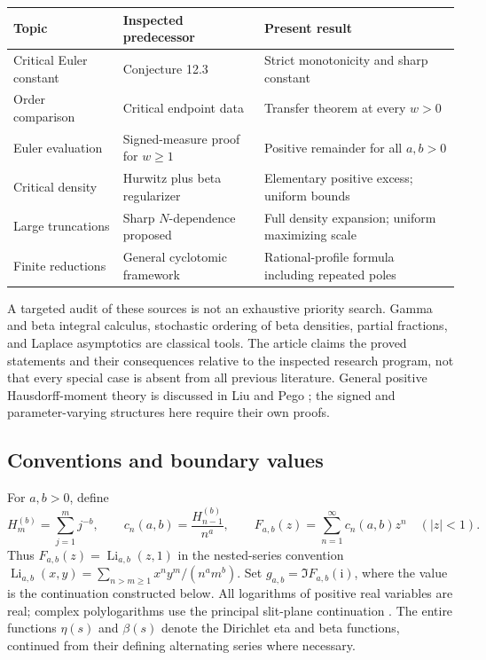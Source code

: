 \documentclass[11pt]{article}
\numberwithin{equation}{section}
\theoremstyle{definition}\newtheorem{definition}[theorem]{Definition}
\theoremstyle{remark}\newtheorem{remark}[theorem]{Remark}
\DeclareMathOperator{\Li}{Li}
\newcommand{\ii}{\mathrm i}
\begin{document}
\begin{center}\small
\begin{tabular}{@{}p{}p{}p{}@{}}
\toprule
Topic & Inspected predecessor & Present result\\
\midrule
Critical Euler constant & Conjecture 12.3 & Strict monotonicity and sharp constant\\[3pt]
Order comparison & Critical endpoint data & Transfer theorem at every $w>0$\\[3pt]
Euler evaluation & Signed-measure proof for $w\ge1$ & Positive remainder for all $a,b>0$\\[3pt]
Critical density & Hurwitz plus beta regularizer & Elementary positive excess; uniform bounds\\[3pt]
Large truncations & Sharp $N$-dependence proposed & Full density expansion; uniform maximizing scale\\[3pt]
Finite reductions & General cyclotomic framework & Rational-profile formula including repeated poles\\
\bottomrule
\end{tabular}
\end{center}

A targeted audit of these sources is not an exhaustive priority search.
Gamma and beta integral calculus, stochastic ordering of beta densities,
partial fractions, and Laplace asymptotics are classical tools. The
article claims the proved statements and their consequences relative to
the inspected research program, not that every special case is absent
from all previous literature. General positive Hausdorff-moment theory
is discussed in Liu and Pego \cite{liupego}; the signed and parameter-varying
structures here require their own proofs.

\subsection{Conventions and boundary values}
For $a,b>0$, define
\begin{equation}\label{eq:Fdef}
 H_m^{(b)}=\sum_{j=1}^m j^{-b},\qquad
 c_n(a,b)=\frac{H_{n-1}^{(b)}}{n^a},\qquad
 F_{a,b}(z)=\sum_{n=1}^\infty c_n(a,b)z^n\quad(|z|<1).
\end{equation}
Thus $F_{a,b}(z)=\Li_{a,b}(z,1)$ in the nested-series convention
$\Li_{a,b}(x,y)=\sum_{n>m\ge1}x^ny^m/(n^am^b)$.
Set $g_{a,b}=\Im F_{a,b}(\ii)$, where the value is the continuation
constructed below. All logarithms of positive real variables are real;
complex polylogarithms use the principal slit-plane continuation
\cite{dlmfpolylog}. The entire functions $\eta(s)$ and $\beta(s)$ denote
the Dirichlet eta and beta functions, continued from their defining
alternating series where necessary.
\end{document}
